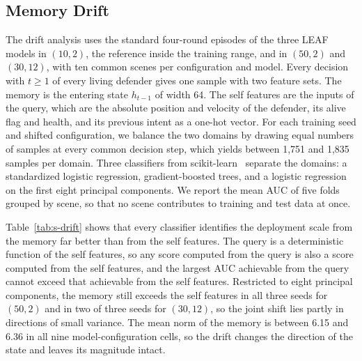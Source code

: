 \subsection{Memory Drift}
The drift analysis uses the standard four-round episodes of the three LEAF models in $(10,2)$, the reference inside the training range, and in $(50,2)$ and $(30,12)$, with ten common scenes per configuration and model. Every decision with $t\ge1$ of every living defender gives one sample with two feature sets. The memory is the entering state $h_{t-1}$ of width 64. The self features are the inputs of the query, which are the absolute position and velocity of the defender, its alive flag and health, and its previous intent as a one-hot vector. For each training seed and shifted configuration, we balance the two domains by drawing equal numbers of samples at every common decision step, which yields between 1,751 and 1,835 samples per domain. Three classifiers from scikit-learn~\cite{pedregosa2011sklearn} separate the domains: a standardized logistic regression, gradient-boosted trees, and a logistic regression on the first eight principal components. We report the mean AUC of five folds grouped by scene, so that no scene contributes to training and test data at once.

Table~\ref{tab:s-drift} shows that every classifier identifies the deployment scale from the memory far better than from the self features. The query is a deterministic function of the self features, so any score computed from the query is also a score computed from the self features, and the largest AUC achievable from the query cannot exceed that achievable from the self features. Restricted to eight principal components, the memory still exceeds the self features in all three seeds for $(50,2)$ and in two of three seeds for $(30,12)$, so the joint shift lies partly in directions of small variance. The mean norm of the memory is between 6.15 and 6.36 in all nine model-configuration cells, so the drift changes the direction of the state and leaves its magnitude intact.

